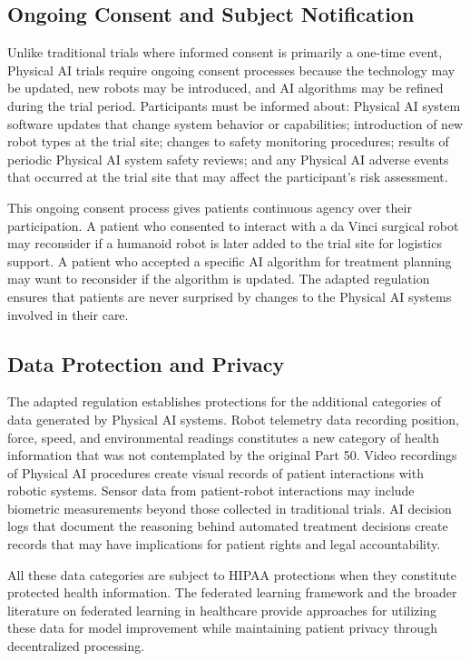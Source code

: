 \subsection{Ongoing Consent and Subject Notification}
\label{subsec:cfr50-ongoing}

Unlike traditional trials where informed consent is primarily a one-time event,
Physical AI trials require ongoing consent processes because the technology may
be updated, new robots may be introduced, and AI algorithms may be refined
during the trial period. Participants must be informed about: Physical AI system
software updates that change system behavior or capabilities; introduction of
new robot types at the trial site; changes to safety monitoring procedures;
results of periodic Physical AI system safety reviews; and any Physical AI
adverse events that occurred at the trial site that may affect the
participant's risk assessment.

This ongoing consent process gives patients continuous agency over their
participation. A patient who consented to interact with a da Vinci surgical
robot may reconsider if a humanoid robot is later added to the trial site for
logistics support. A patient who accepted a specific AI algorithm for treatment
planning may want to reconsider if the algorithm is updated. The adapted
regulation ensures that patients are never surprised by changes to the Physical
AI systems involved in their care.

\subsection{Data Protection and Privacy}
\label{subsec:cfr50-data}

The adapted regulation establishes protections for the additional categories of
data generated by Physical AI systems. Robot telemetry data recording position,
force, speed, and environmental readings constitutes a new category of health
information that was not contemplated by the original Part 50. Video recordings
of Physical AI procedures create visual records of patient interactions with
robotic systems. Sensor data from patient-robot interactions may include
biometric measurements beyond those collected in traditional trials. AI decision
logs that document the reasoning behind automated treatment decisions create
records that may have implications for patient rights and legal accountability.

All these data categories are subject to HIPAA \cite{hipaa} protections when
they constitute protected health information. The federated learning framework
\cite{fl-paper} and the broader literature on federated learning in healthcare
\cite{federated-learning-healthcare} provide approaches for utilizing these
data for model improvement while maintaining patient privacy through
decentralized processing.


